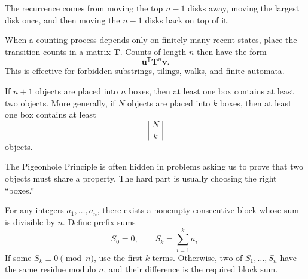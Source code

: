     \begin{remark}
        The recurrence comes from moving the top $n-1$ disks away, moving the
        largest disk once, and then moving the $n-1$ disks back on top of it.
    \end{remark}

    \begin{strategy}
        When a counting process depends only on finitely many recent states,
        place the transition counts in a matrix $\mathbf{T}$. Counts of length
        $n$ then have the form
        \[
            \mathbf{u}^{\mathsf T}\mathbf{T}^n\mathbf{v}.
        \]
        This is effective for forbidden substrings, tilings, walks, and finite
        automata.
    \end{strategy}

    \begin{theorem}
        If $n+1$ objects are placed into $n$ boxes, then at least one box
        contains at least two objects.
        More generally, if $N$ objects are placed into $k$ boxes, then at least
        one box contains at least
        \[
            \left\lceil\frac{N}{k}\right\rceil
        \]
        objects.
    \end{theorem}

    \begin{strategy}
        The Pigeonhole Principle is often hidden in problems asking us to prove
        that two objects must share a property. The hard part is usually
        choosing the right ``boxes.''
    \end{strategy}

    \begin{theorem}
        For any integers $a_1,\dots,a_n$, there exists a nonempty consecutive
        block whose sum is divisible by $n$. Define prefix sums
        \[
            S_0=0,
            \qquad
            S_k=\sum_{i=1}^{k}a_i.
        \]
        If some $S_k\equiv0\pmod n$, use the first $k$ terms. Otherwise, two
        of $S_1,\dots,S_n$ have the same residue modulo $n$, and their difference
        is the required block sum.
    \end{theorem}

